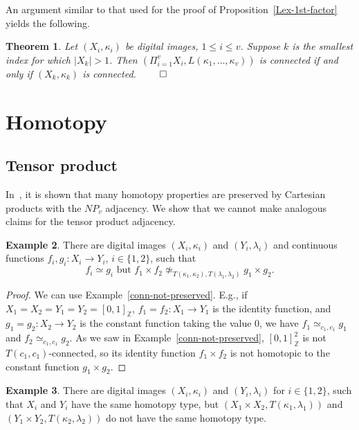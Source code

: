 \documentclass{article}
\theoremstyle{plain}
\newtheorem{thm}{Theorem}
\theoremstyle{definition}
\newtheorem{exl}[thm]{Example}
\numberwithin{thm}{section}
\def\Z{{\mathbb Z}}
\begin{document}
An argument similar to that used
for the proof of Proposition~\ref{Lex-1st-factor}
yields the following.

\begin{thm}
\label{lex-conn}
Let $(X_i,\kappa_i)$ be digital
images, $1 \leq i \le v$.
Suppose $k$ is the smallest
index for which $|X_k|>1$.
Then $(\Pi_{i=1}^v X_i, L(\kappa_1,\ldots,\kappa_v))$ is
connected if and only if
$(X_k,\kappa_k)$ is connected. $\qed$
\end{thm}

\section{Homotopy}
\subsection{Tensor product}
In~\cite{Boxer16a}, it is shown that many homotopy properties are
preserved by Cartesian products with the $NP_v$ adjacency. 
We show that we cannot make analogous claims for
the tensor product adjacency.

\begin{exl}
\label{htpy-not-preserved}
There are digital
images $(X_i,\kappa_i)$ and $(Y_i,\lambda_i)$ and continuous
functions $f_i,g_i: X_i \to Y_i$,
$i \in \{1,2\}$, such that
\[ f_i \simeq g_i \mbox{ but }
f_1 \times f_2 \not \simeq_{T(\kappa_1,\kappa_2),T(\lambda_1,\lambda_2)} g_1 \times g_2. \]
\end{exl}

\begin{proof}
We can use Example~\ref{conn-not-preserved}. E.g., if
$X_1=X_2=Y_1=Y_2=[0,1]_{\Z}$,
$f_1=f_2: X_1 \to Y_1$ is the identity
function, and $g_1=g_2: X_2 \to Y_2$ is the constant function taking the 
value 0, we have $f_1 \simeq_{c_1,c_1}g_1$ and 
$f_2 \simeq_{c_1,c_1}g_2$. As
we saw in Example~\ref{conn-not-preserved}, $[0,1]_{\Z}^2$
is not $T(c_1,c_1)$-connected, so its identity function $f_1 \times f_2$ is not 
homotopic to the constant function $g_1 \times g_2$.
\end{proof}

\begin{exl}
\label{htpy-type-not-preserved}
There are digital
images $(X_i,\kappa_i)$ and $(Y_i,\lambda_i)$ for $i \in \{1,2\}$, such that
$X_i$ and $Y_i$ have the same homotopy type,
but $(X_1 \times X_2,T(\kappa_1,\lambda_1))$ and 
$(Y_1 \times Y_2,T(\kappa_2,\lambda_2))$ do not have
the same homotopy type.
\end{exl}
\end{document}
